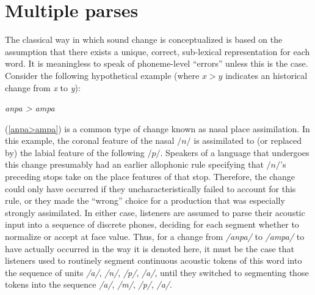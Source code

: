 \section{Multiple parses}

The classical way in which sound change is conceptualized is based
on the assumption that there exists a unique, correct, sub-lexical
representation for each word. It is meaningless to speak of phoneme-level
“errors” unless this is the case. Consider the following hypothetical
example (where \emph{$x>y$} indicates an historical change from \emph{x}
to \emph{y}):
\begin{covexamples}
\item \label{anpa>ampa}\emph{anpa \textgreater{} ampa}
\end{covexamples}
(\ref{anpa>ampa}) is a common type of change known as nasal place
assimilation. In this example, the coronal feature of the nasal $/n/$
is assimilated to (or replaced by) the labial feature of the following
$/p/$. Speakers of a language that undergoes this change presumably
had an earlier allophonic rule specifying that $/n/$'s preceding
stops take on the place features of that stop. Therefore, the change
could only have occurred if they uncharacteristically failed to account
for this rule, or they made the “wrong” choice for a production
that was especially strongly assimilated. In either case, listeners
are assumed to parse their acoustic input into a sequence of discrete
phones, deciding for each segment whether to normalize or accept at
face value. Thus, for a change from \emph{/anpa/} to \emph{/ampa/}
to have actually occurred in the way it is denoted here, it must be
the case that listeners used to routinely segment continuous acoustic
tokens of this word into the sequence of units \emph{/a/}, \emph{/n/},
\emph{/p/}, \emph{/a/}, until they switched to segmenting
those tokens into the sequence \emph{/a/}, \emph{/m/}, \emph{/p/},
\emph{/a/}. 

